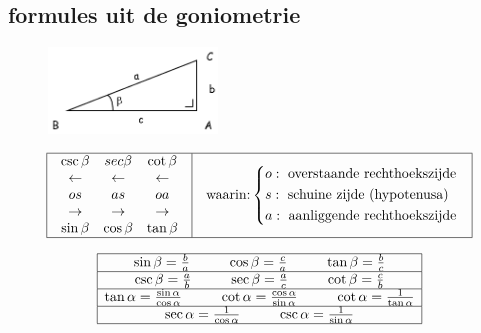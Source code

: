 \documentclass[a5paper]{article}
\begin{document}
\subsection{formules uit de goniometrie}

\begin{figure}[h]
\centering
\includegraphics[width=0.4\textwidth]{image_goniometrie_sin_cos_tan.png}
\label{fig:sin_cos_tan}
\end{figure}

{
\[\begin{array}{|c|c|}
\hline
\begin{array}{*{20}{c}}
{\csc \beta }&{sec\beta }&{\cot \beta }\\
 \leftarrow & \leftarrow & \leftarrow \\
{os}&{as}&{oa}\\
 \to & \to & \to \\
{\sin \beta }&{\cos \beta }&{\tan \beta }
\end{array}

& %

\begin{array}{l}
\text{waarin:} 
\left\{
\begin{aligned}
& o: \text{ overstaande rechthoekszijde} \\
& s: \text{ schuine zijde (hypotenusa)} \\
& a: \text{ aanliggende rechthoekszijde}
\end{aligned}
\right.
\end{array} \\ 
\hline
\end{array}
\]

\[
\begin{array}{|c|c|}
\hline
\text{sin} \, \beta = \frac{b}{a} \hspace{1cm} \text{cos} \, \beta = \frac{c}{a} \hspace{1cm} \text{tan} \, \beta = \frac{b}{c} \\
\hline
\text{csc} \, \beta = \frac{a}{b} \hspace{1cm} \text{sec} \, \beta = \frac{a}{c} \hspace{1cm} \text{cot} \, \beta = \frac{c}{b} \\
\hline
\text{tan} \, \alpha = \frac{\sin \alpha}{\cos \alpha} \hspace{1cm} \text{cot} \, \alpha = \frac{\cos \alpha}{\sin \alpha} \hspace{1cm} \text{cot} \, \alpha = \frac{1}{\tan \alpha} \\
\hline
\text{sec} \, \alpha = \frac{1}{\cos \alpha} \hspace{1cm} \text{csc} \, \alpha = \frac{1}{\sin \alpha}\\
\hline
\end{array}
\]

}
\end{document}
